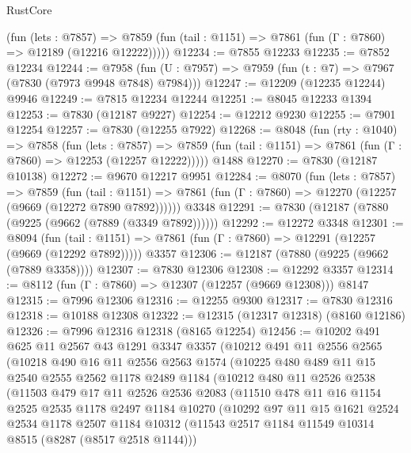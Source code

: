 \begin{lexlean}{RustCore}
\begin{coremodule}
      (fun (lets : @7857) =>
      @7859 (fun (tail : @1151) => @7861 (fun (Γ : @7860) => @12189 (@12216 @12222)))))
@12234 := @7855 @12233
@12235 := @7852 @12234
@12244 := @7958 (fun (U : @7957) => @7959 (fun (t : @7) => @7967 (@7830 (@7973 @9948 @7848) @7984)))
@12247 := @12209 (@12235 @12244) @9946
@12249 := @7815 @12234 @12244
@12251 := @8045 @12233 @1394
@12253 := @7830 (@12187 @9227)
@12254 := @12212 @9230
@12255 := @7901 @12254
@12257 := @7830 (@12255 @7922)
@12268 := @8048
    (fun (rty : @1040) =>
    @7858
      (fun (lets : @7857) =>
      @7859 (fun (tail : @1151) => @7861 (fun (Γ : @7860) => @12253 (@12257 @12222)))))
    @1488
@12270 := @7830 (@12187 @10138)
@12272 := @9670 @12217 @9951
@12284 := @8070
    (fun (lets : @7857) =>
    @7859
      (fun (tail : @1151) =>
      @7861 (fun (Γ : @7860) => @12270 (@12257 (@9669 (@12272 @7890 @7892))))))
    @3348
@12291 := @7830 (@12187 (@7880 (@9225 (@9662 (@7889 (@3349 @7892))))))
@12292 := @12272 @3348
@12301 := @8094
    (fun (tail : @1151) => @7861 (fun (Γ : @7860) => @12291 (@12257 (@9669 (@12292 @7892)))))
    @3357
@12306 := @12187 (@7880 (@9225 (@9662 (@7889 @3358))))
@12307 := @7830 @12306
@12308 := @12292 @3357
@12314 := @8112 (fun (Γ : @7860) => @12307 (@12257 (@9669 @12308))) @8147
@12315 := @7996 @12306
@12316 := @12255 @9300
@12317 := @7830 @12316
@12318 := @10188 @12308
@12322 := @12315 (@12317 @12318) (@8160 @12186)
@12326 := @7996 @12316 @12318 (@8165 @12254)
@12456 := @10202
    @491
    @625
    @11
    @2567
    @43
    @1291
    @3347
    @3357
    (@10212
      @491
      @11
      @2556
      @2565
      (@10218
        @490
        @16
        @11
        @2556
        @2563
        @1574
        (@10225
          @480
          @489
          @11
          @15
          @2540
          @2555
          @2562
          @1178
          @2489
          @1184
          (@10212
            @480
            @11
            @2526
            @2538
            (@11503
              @479
              @17
              @11
              @2526
              @2536
              @2083
              (@11510
                @478
                @11
                @16
                @1154
                @2525
                @2535
                @1178
                @2497
                @1184
                @10270
                (@10292
                  @97
                  @11
                  @15
                  @1621
                  @2524
                  @2534
                  @1178
                  @2507
                  @1184
                  @10312
                  (@11543 @2517 @1184 @11549 @10314 @8515 (@8287 (@8517 @2518 @1144)))

\end{coremodule}
\end{lexlean}
